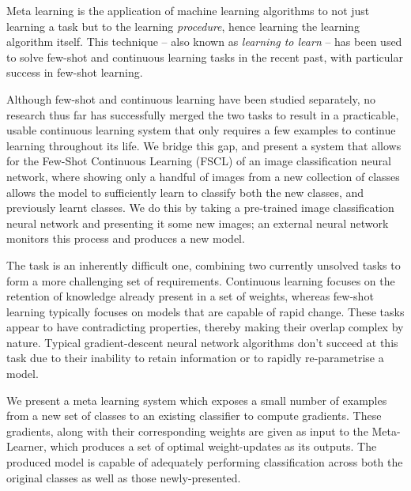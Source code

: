 \documentclass{report}
\begin{document}
Meta learning is the application of machine learning algorithms to not just learning a task but to the learning \emph{procedure}, hence learning the learning algorithm itself. This technique -- also known as \emph{learning to learn} -- has been used to solve few-shot and continuous learning tasks in the recent past\parencite{lotsag}\parencite{maml}\parencite{reptile}\parencite{mlwtc}, with particular success in few-shot learning\parencite{maml}\parencite{matching}\parencite{mlwtc}. \par

Although few-shot and continuous learning have been studied separately, no research thus far has successfully merged the two tasks to result in a practicable, usable continuous learning system that only requires a few examples to continue learning throughout its life. We bridge this gap, and present a system that allows for the Few-Shot Continuous Learning (FSCL) of an image classification neural network, where showing only a handful of images from a new collection of classes allows the model to sufficiently learn to classify both the new classes, and previously learnt classes. We do this by taking a pre-trained image classification neural network and presenting it some new images; an external neural network monitors this process and produces a new model. \par

The task is an inherently difficult one, combining two currently unsolved tasks to form a more challenging set of requirements. Continuous learning focuses on the retention of knowledge already present in a set of weights, whereas few-shot learning typically focuses on models that are capable of rapid change. These tasks appear to have contradicting properties, thereby making their overlap complex by nature. Typical gradient-descent neural network algorithms don't succeed at this task due to their inability to retain information or to rapidly re-parametrise a model. \par

We present a meta learning system which exposes a small number of examples from a new set of classes to an existing classifier to compute gradients. These gradients, along with their corresponding weights are given as input to the Meta-Learner, which produces a set of optimal weight-updates as its outputs. The produced model is capable of adequately performing classification across both the original classes as well as those newly-presented. \par
\end{document}

